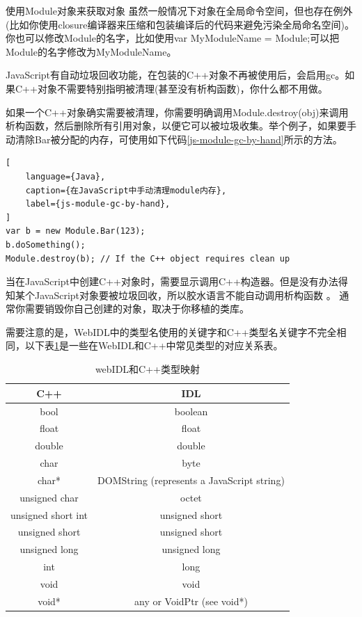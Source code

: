 使用Module对象来获取对象 虽然一般情况下对象在全局命令空间，但也存在例外(比如你使用closure编译器来压缩和包装编译后的代码来避免污染全局命名空间)。你也可以修改Module的名字，比如使用var MyModuleName = Module;可以把Module的名字修改为MyModuleName。

JavaScript有自动垃圾回收功能，在包装的C++对象不再被使用后，会启用gc。如果C++对象不需要特别指明被清理(甚至没有析构函数)，你什么都不用做。

如果一个C++对象确实需要被清理，你需要明确调用Module.destroy(obj)来调用析构函数，然后删除所有引用对象，以便它可以被垃圾收集。举个例子，如果要手动清除Bar被分配的内存，可使用如下代码\ref{js-module-gc-by-hand}所示的方法。

\begin{lstlisting}[
    language={Java},
    caption={在JavaScript中手动清理module内存},
    label={js-module-gc-by-hand},
]
var b = new Module.Bar(123);
b.doSomething();
Module.destroy(b); // If the C++ object requires clean up
\end{lstlisting}

当在JavaScript中创建C++对象时，需要显示调用C++构造器。但是没有办法得知某个JavaScript对象要被垃圾回收，所以胶水语言不能自动调用析构函数 。
通常你需要销毁你自己创建的对象，取决于你移植的类库。

需要注意的是，WebIDL中的类型名使用的关键字和C++类型名关键字不完全相同，以下表\ref{webidl-types-from-c-types}是一些在WebIDL和C++中常见类型的对应关系表。

\begin{table}
    \centering
    \caption{webIDL和C++类型映射}
    \label{webidl-types-from-c-types}
    \begin{tabular}{c|c}
        \hline
        C++ & IDL  \\ \hline \hline
        bool  &  boolean \\ \hline
        float &  float  \\ \hline
        double &  double  \\ \hline
        char &   byte  \\ \hline
        char* &  DOMString (represents a JavaScript string)  \\ \hline
        unsigned char &  octet  \\ \hline
        unsigned short int & unsigned short  \\ \hline
        unsigned short & unsigned short  \\ \hline
        unsigned long  & unsigned long  \\ \hline
        int & long  \\ \hline
        void  &  void  \\ \hline
        void* &  any or VoidPtr (see void*)  \\ \hline
    \end{tabular}
\end{table}









